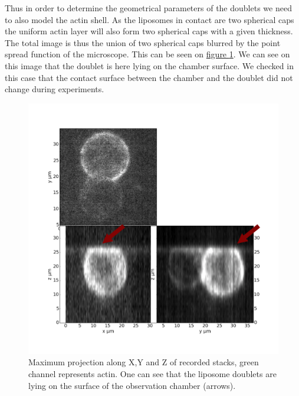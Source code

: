 \documentclass[A4paperpaper,11pt,english]{sphinxmanual}
\begin{document}
Thus in order to determine the geometrical parameters of the doublets we need
to also model the actin shell. As the liposomes in contact are two spherical
caps the uniform actin layer will also form two spherical caps with a given
thickness. The total image is thus the union of two spherical caps blurred by
the point spread function of the microscope. This can be seen on \hyperref[index-latex:mproj1]{figure  \ref*{index-latex:mproj1}}.  We can see on this image that the doublet is here lying on the
chamber surface. We checked in this case that the contact surface between the
chamber and the doublet did not change during experiments.
\begin{figure}[htbp]
\centering
\capstart

\includegraphics[width=0.800\linewidth]{max_proj_340A.png}
\caption{Maximum projection along X,Y and Z of recorded stacks, green channel represents actin.
One can see that the liposome doublets are lying on the surface of the
observation chamber (arrows).}\label{index-latex:mproj1}\end{figure}
\end{document}
